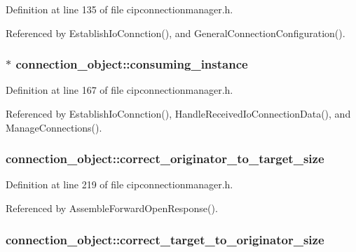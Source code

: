 \-Definition at line 135 of file cipconnectionmanager.\-h.



\-Referenced by \-Establish\-Io\-Connction(), and \-General\-Connection\-Configuration().

\hypertarget{structconnection__object_aef7f726017a6d89235c9ee8c0ef98d71}{
\subsubsection[{consuming\-\_\-instance}]{$\ast$ {\bf connection\-\_\-object\-::consuming\-\_\-instance}}}\label{d1/d48/structconnection__object_aef7f726017a6d89235c9ee8c0ef98d71}


\-Definition at line 167 of file cipconnectionmanager.\-h.



\-Referenced by \-Establish\-Io\-Connction(), \-Handle\-Received\-Io\-Connection\-Data(), and \-Manage\-Connections().

\hypertarget{structconnection__object_a5d14bc0c2fbc0b5b80a9d6fdefb4d95e}{
\subsubsection[{correct\-\_\-originator\-\_\-to\-\_\-target\-\_\-size}]{ {\bf connection\-\_\-object\-::correct\-\_\-originator\-\_\-to\-\_\-target\-\_\-size}}}\label{d1/d48/structconnection__object_a5d14bc0c2fbc0b5b80a9d6fdefb4d95e}


\-Definition at line 219 of file cipconnectionmanager.\-h.



\-Referenced by \-Assemble\-Forward\-Open\-Response().

\hypertarget{structconnection__object_a35971ed504cab3b06d633738fd48273d}{
\subsubsection[{correct\-\_\-target\-\_\-to\-\_\-originator\-\_\-size}]{ {\bf connection\-\_\-object\-::correct\-\_\-target\-\_\-to\-\_\-originator\-\_\-size}}}\label{d1/d48/structconnection__object_a35971ed504cab3b06d633738fd48273d}


